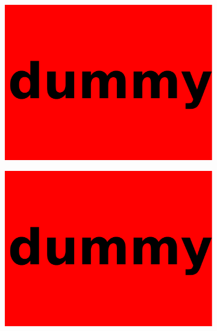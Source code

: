 \begin{figure}
\centering
\begin{subfigure}[]{0.49\textwidth}
	\includegraphics[width=\textwidth]{images/dummy.pdf}
\end{subfigure}
\begin{subfigure}[]{0.49\textwidth}
	\includegraphics[width=\textwidth]{images/dummy.pdf}
\end{subfigure}


\end{figure}
